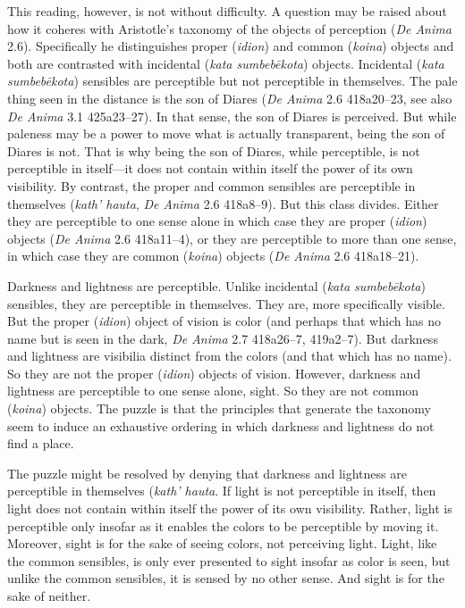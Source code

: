 This reading, however, is not without difficulty. A question may be raised about how it coheres with Aristotle's taxonomy of the objects of perception (\emph{De Anima} 2.6). Specifically he distinguishes proper (\emph{idion}) and common (\emph{koina}) objects and both are contrasted with incidental (\emph{kata sumbebēkota}) objects. Incidental (\emph{kata sumbebēkota}) sensibles are perceptible but not perceptible in themselves. The pale thing seen in the distance is the son of Diares (\emph{De Anima} 2.6 418a20–23, see also \emph{De Anima} 3.1 425a23–27). In that sense, the son of Diares is perceived. But while paleness may be a power to move what is actually transparent, being the son of Diares is not. That is why being the son of Diares, while perceptible, is not perceptible in itself—it does not contain within itself the power of its own visibility. By contrast, the proper and common sensibles are perceptible in themselves (\emph{kath' hauta}, \emph{De Anima} 2.6 418a8–9). But this class divides. Either they are perceptible to one sense alone in which case they are proper (\emph{idion}) objects (\emph{De Anima} 2.6 418a11–4), or they are perceptible to more than one sense, in which case they are common (\emph{koina}) objects (\emph{De Anima} 2.6 418a18–21).

Darkness and lightness are perceptible. Unlike incidental (\emph{kata sumbebēkota}) sensibles, they are perceptible in themselves. They are, more specifically visible. But the proper (\emph{idion}) object of vision is color (and perhaps that which has no name but is seen in the dark, \emph{De Anima} 2.7 418a26–7, 419a2–7). But darkness and lightness are visibilia distinct from the colors (and that which has no name). So they are not the proper (\emph{idion}) objects of vision. However, darkness and lightness are perceptible to one sense alone, sight. So they are not common (\emph{koina}) objects. The puzzle is that the principles that generate the taxonomy seem to induce an exhaustive ordering in which darkness and lightness do not find a place. 

The puzzle might be resolved by denying that darkness and lightness are perceptible in themselves (\emph{kath' hauta}. If light is not perceptible in itself, then light does not contain within itself the power of its own visibility. Rather, light is perceptible only insofar as it enables the colors to be perceptible by moving it. Moreover, sight is for the sake of seeing colors, not perceiving light. Light, like the common sensibles, is only ever presented to sight insofar as color is seen, but unlike the common sensibles, it is sensed by no other sense. And sight is for the sake of neither.

